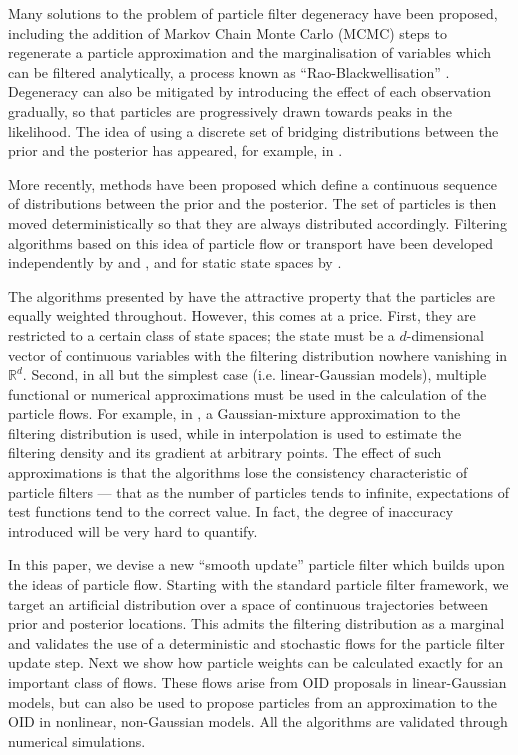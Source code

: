 \documentclass[a4paper,10pt]{article}
\begin{document}
Many solutions to the problem of particle filter degeneracy have been proposed, including the addition of Markov Chain Monte Carlo (MCMC) steps to regenerate a particle approximation \cite{Gilks2001} and the marginalisation of variables which can be filtered analytically, a process known as ``Rao-Blackwellisation'' \cite{Casella1996,Doucet2000}. Degeneracy can also be mitigated by introducing the effect of each observation gradually, so that particles are progressively drawn towards peaks in the likelihood. The idea of using a discrete set of bridging distributions between the prior and the posterior has appeared, for example, in \cite{Godsill2001b}.

More recently, methods have been proposed which define a continuous sequence of distributions between the prior and the posterior. The set of particles is then moved deterministically so that they are always distributed accordingly. Filtering algorithms based on this idea of particle flow or transport have been developed independently by \cite{Daum2008,Daum2011d} and \cite{Reich2011}, and for static state spaces by \cite{Moselhy2012}.

The algorithms presented by \cite{Daum2008,Daum2011d,Reich2011} have the attractive property that the particles are equally weighted throughout. However, this comes at a price. First, they are restricted to a certain class of state spaces; the state must be a $d$-dimensional vector of continuous variables with the filtering distribution nowhere vanishing in $\mathbb{R}^d$. Second, in all but the simplest case (i.e. linear-Gaussian models), multiple functional or numerical approximations must be used in the calculation of the particle flows. For example, in \cite{Reich2011}, a Gaussian-mixture approximation to the filtering distribution is used, while in \cite{Daum2009a} interpolation is used to estimate the filtering density and its gradient at arbitrary points. The effect of such approximations is that the algorithms lose the consistency characteristic of particle filters --- that as the number of particles tends to infinite, expectations of test functions tend to the correct value. In fact, the degree of inaccuracy introduced will be very hard to quantify.

In this paper, we devise a new ``smooth update'' particle filter which builds upon the ideas of particle flow. Starting with the standard particle filter framework, we target an artificial distribution over a space of continuous trajectories between prior and posterior locations. This admits the filtering distribution as a marginal and validates the use of a deterministic and stochastic flows for the particle filter update step. Next we show how particle weights can be calculated exactly for an important class of flows. These flows arise from OID proposals in linear-Gaussian models, but can also be used to propose particles from an approximation to the OID in nonlinear, non-Gaussian models. All the algorithms are validated through numerical simulations.
\end{document}
